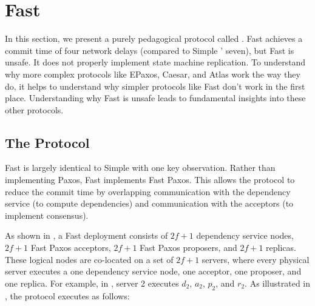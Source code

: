 \section{Fast \BPaxos{}}
In this section, we present a purely pedagogical protocol called . Fast \BPaxos{} achieves a commit time of four network delays
(compared to Simple \BPaxos{}' seven), but Fast \BPaxos{} is unsafe. It does not
properly implement state machine replication. To understand why more complex
protocols like EPaxos, Caesar, and Atlas work the way they do, it helps to
understand why simpler protocols like Fast \BPaxos{} don't work in the first
place. Understanding why Fast \BPaxos{} is unsafe leads to fundamental insights
into these other protocols.

\subsection{The Protocol}
{}

Fast \BPaxos{} is largely identical to Simple \BPaxos{} with one key
observation. Rather than implementing Paxos, Fast \BPaxos{} implements Fast
Paxos. This allows the protocol to reduce the commit time by overlapping
communication with the dependency service (to compute dependencies) and
communication with the acceptors (to implement consensus).

As shown in , a Fast \BPaxos{} deployment consists of $2f+1$
dependency service nodes, $2f+1$ Fast Paxos acceptors, $2f+1$ Fast Paxos
proposers, and $2f+1$ replicas. These logical nodes are co-located on a set of
$2f+1$ servers, where every physical server executes a one dependency service
node, one acceptor, one proposer, and one replica. For example, in
, server 2 executes $d_2$, $a_2$, $p_2$, and $r_2$. As
illustrated in , the protocol executes as follows:

